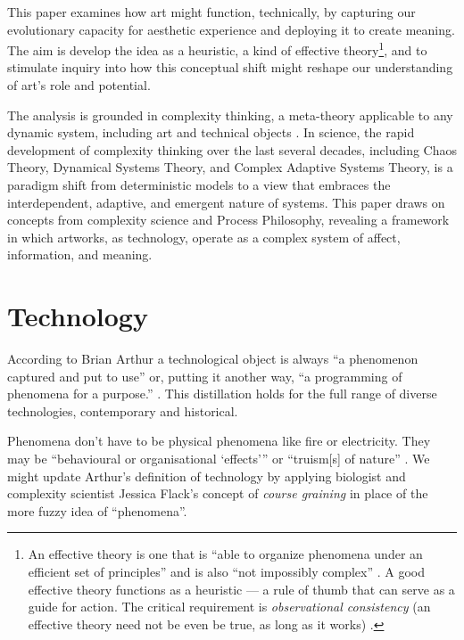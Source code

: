 \documentclass[letterpaper]{article}
\begin{document}
    This paper examines how art might function, technically, by capturing our evolutionary capacity for aesthetic experience and deploying it to create meaning. The aim is develop the idea as a heuristic, a kind of effective theory\footnote{
        An effective theory is one that is “able to organize phenomena under an efficient set of principles” and is also “not impossibly complex” \citep[p.1]{WellsEffctvThrs2012}. A good effective theory functions as a heuristic — a rule of thumb that can serve as a guide for action. The critical requirement is \emph{observational consistency} (an effective theory need not be even be true, as long as it works) \citep[p.71]{WellsEffctvThrs2012}.
    }, and to stimulate inquiry into how this conceptual shift might reshape our understanding of art's role and potential.

    The analysis is grounded in complexity thinking, a meta-theory applicable to any dynamic system, including art and technical objects \citep{CilliersRichardsonCmplxtyScnc2001}. In science, the rapid development of complexity thinking over the last several decades, including Chaos Theory, Dynamical Systems Theory, and Complex Adaptive Systems Theory, is a paradigm shift from deterministic models to a view that embraces the interdependent, adaptive, and emergent nature of systems. This paper draws on concepts from complexity science and Process Philosophy, revealing a framework in which artworks, as technology, operate as a complex system of affect, information, and meaning.
    
\section{Technology}

    According to Brian Arthur a technological object is always “a phenomenon captured and put to use” \citep[p.53]{theNatureOfTechnology2009} or, putting it another way, “a programming of phenomena for a purpose.” \citep[p.53]{theNatureOfTechnology2009}. This distillation holds for the full range of diverse technologies, contemporary and historical.

    Phenomena don't have to be physical phenomena like fire or electricity. They may be “behavioural or organisational ‘effects’” \citep[p.55]{theNatureOfTechnology2009} or “truism[s] of nature” \citep[p.45]{theNatureOfTechnology2009}. We might update Arthur's definition of technology by applying biologist and complexity scientist Jessica Flack's concept of \emph{course graining} in place of the more fuzzy idea of “phenomena”. 
\end{document}
